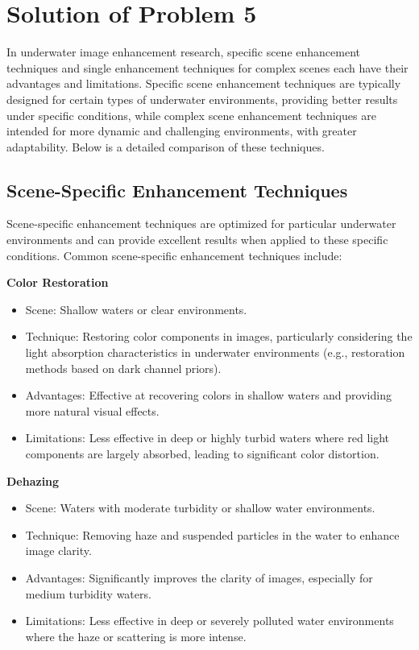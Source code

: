 \documentclass[withoutpreface,bwprint]{cumcmthesis}
\begin{document}
\newpage
\section{Solution of Problem 5}

In underwater image enhancement research, specific scene enhancement techniques and single enhancement techniques for complex scenes each have their advantages and limitations. Specific scene enhancement techniques are typically designed for certain types of underwater environments, providing better results under specific conditions, while complex scene enhancement techniques are intended for more dynamic and challenging environments, with greater adaptability. Below is a detailed comparison of these techniques.

\subsection{Scene-Specific Enhancement Techniques}

Scene-specific enhancement techniques are optimized for particular underwater environments and can provide excellent results when applied to these specific conditions. Common scene-specific enhancement techniques include:

\textbf{Color Restoration}

\begin{itemize}[itemindent=2em]
    \item Scene: Shallow waters or clear environments.

    \item Technique: Restoring color components in images, particularly considering the light absorption characteristics in underwater environments (e.g., restoration methods based on dark channel priors).

    \item  Advantages: Effective at recovering colors in shallow waters and providing more natural visual effects.

    \item  Limitations: Less effective in deep or highly turbid waters where red light components are largely absorbed, leading to significant color distortion.
\end{itemize}

\textbf{Dehazing}

\begin{itemize}[itemindent=2em]
    \item Scene: Waters with moderate turbidity or shallow water environments.

    \item Technique: Removing haze and suspended particles in the water to enhance image clarity.

    \item  Advantages: Significantly improves the clarity of images, especially for medium turbidity waters.

    \item  Limitations: Less effective in deep or severely polluted water environments where the haze or scattering is more intense.
\end{itemize}
\end{document}
